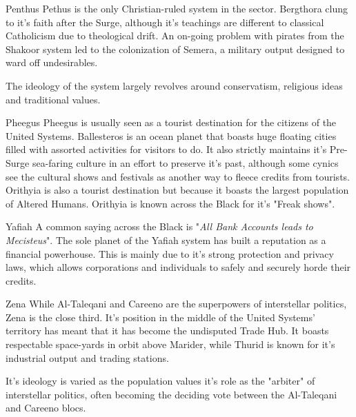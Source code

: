 \begin{multicols}{2}
  \begin{genericsection}{Penthus}
  Pethus is the only Christian-ruled system in the sector. Bergthora clung to it's faith after the Surge, although it's teachings are different to classical Catholicism due to theological drift. An on-going problem with pirates from the Shakoor system led to the colonization of Semera, a military output designed to ward off undesirables.
  
  The ideology of the system largely revolves around conservatism, religious ideas and traditional values.
  \end{genericsection}
  
  \begin{genericsection}{Pheegus}
  Pheegus is usually seen as a tourist destination for the citizens of the United Systems. Ballesteros is an ocean planet that boasts huge floating cities filled with assorted activities for visitors to do. It also strictly maintains it's Pre-Surge sea-faring culture in an effort to preserve it's past, although some cynics see the cultural shows and festivals as another way to fleece credits from tourists. Orithyia is also a tourist destination but because it boasts the largest population of Altered Humans. Orithyia is known across the Black for it's "Freak shows".
  \end{genericsection}
  
  \begin{genericsection}{Yafiah}
  A common saying across the Black is "\textit{All Bank Accounts leads to Mecisteus}". The sole planet of the Yafiah system has built a reputation as a financial powerhouse. This is mainly due to it's strong protection and privacy laws, which allows corporations and individuals to safely and securely horde their credits.
  \end{genericsection}
  
  \begin{genericsection}{Zena}
  While Al-Taleqani and Careeno are the superpowers of interstellar politics, Zena is the close third. It's position in the middle of the United Systems' territory has meant that it has become the undisputed Trade Hub. It boasts respectable space-yards in orbit above Marider, while Thurid is known for it's industrial output and trading stations.
  
  It's ideology is varied as the population values it's role as the "arbiter" of interstellar politics, often becoming the deciding vote between the Al-Taleqani and Careeno blocs.
  \end{genericsection}
  

\end{multicols}
